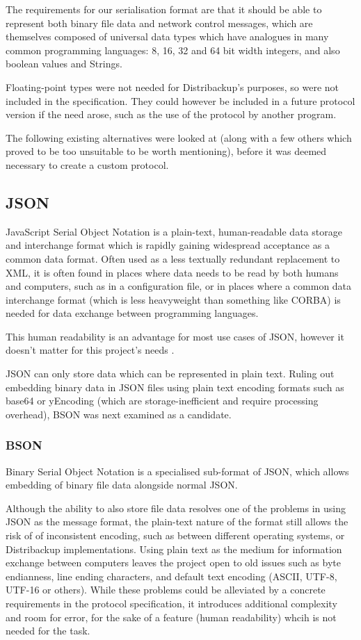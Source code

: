 \documentclass[12pt,a4paper,]{adreport}
\begin{document}
The requirements for our serialisation format are that it should be able
to represent both binary file data and network control messages, which
are themselves composed of universal data types which have analogues in
many common programming languages: 8, 16, 32 and 64 bit width integers,
and also boolean values and Strings.

Floating-point types were not needed for Distribackup's purposes, so
were not included in the specification. They could however be included
in a future protocol version if the need arose, such as the use of the
protocol by another program.

The following existing alternatives were looked at (along with a few
others which proved to be too unsuitable to be worth mentioning), before
it was deemed necessary to create a custom protocol.

\subsection{JSON}\label{json}

JavaScript Serial Object Notation is a plain-text, human-readable data
storage and interchange format which is rapidly gaining widespread
acceptance as a common data format. Often used as a less textually
redundant replacement to XML, it is often found in places where data
needs to be read by both humans and computers, such as in a
configuration file, or in places where a common data interchange format
(which is less heavyweight than something like CORBA) is needed for data
exchange between programming languages.

This human readability is an advantage for most use cases of JSON,
however it doesn't matter for this project's needs .

JSON can only store data which can be represented in plain text. Ruling
out embedding binary data in JSON files using plain text encoding
formats such as base64 or yEncoding (which are storage-inefficient and
require processing overhead), BSON was next examined as a candidate.

\subsubsection{BSON}\label{bson}

Binary Serial Object Notation is a specialised sub-format of JSON, which
allows embedding of binary file data alongside normal JSON.

Although the ability to also store file data resolves one of the
problems in using JSON as the message format, the plain-text nature of
the format still allows the risk of of inconsistent encoding, such as
between different operating systems, or Distribackup implementations.
Using plain text as the medium for information exchange between
computers leaves the project open to old issues such as byte endianness,
line ending characters, and default text encoding (ASCII, UTF-8, UTF-16
or others). While these problems could be alleviated by a concrete
requirements in the protocol specification, it introduces additional
complexity and room for error, for the sake of a feature (human
readability) whcih is not needed for the task.
\end{document}

